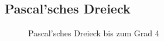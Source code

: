 
\newpage
\subsection{Pascal'sches Dreieck}

\begin{figure}[h!]
	\centering
{}
\caption{Pascal'sches Dreieck bis zum Grad 4}
\end{figure}

